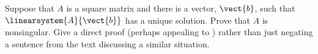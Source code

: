 Suppose that $A$ is a square matrix and there is a vector, $\vect{b}$, such that $\linearsystem{A}{\vect{b}}$ has a unique solution.  Prove that $A$ is nonsingular.  Give a direct proof (perhaps appealing to ) rather than just negating a sentence from the text discussing a similar situation.